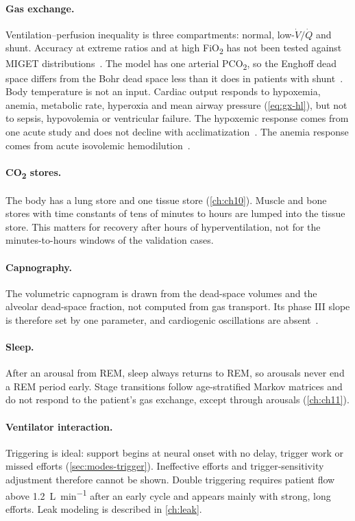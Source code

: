 \paragraph{Gas exchange.} Ventilation--perfusion inequality is three compartments: normal, low-$\dot V/\dot Q$ and shunt. Accuracy at extreme ratios and at high FiO\textsubscript{2} has not been tested against MIGET distributions~\citep{wagner1974,west1969}. The model has one arterial PCO\textsubscript{2}, so the Enghoff dead space differs from the Bohr dead space less than it does in patients with shunt~\citep{enghoff1938}. Body temperature is not an input. Cardiac output responds to hypoxemia, anemia, metabolic rate, hyperoxia and mean airway pressure (\cref{eq:gx-hl}), but not to sepsis, hypovolemia or ventricular failure. The hypoxemic response comes from one acute study and does not decline with acclimatization~\citep{phillips1988}. The anemia response comes from acute isovolemic hemodilution~\citep{weiskopf1998}.

\paragraph{CO\textsubscript{2} stores.} The body has a lung store and one tissue store (\cref{ch:ch10}). Muscle and bone stores with time constants of tens of minutes to hours are lumped into the tissue store. This matters for recovery after hours of hyperventilation, not for the minutes-to-hours windows of the validation cases.

\paragraph{Capnography.} The volumetric capnogram is drawn from the dead-space volumes and the alveolar dead-space fraction, not computed from gas transport. Its phase III slope is therefore set by one parameter, and cardiogenic oscillations are absent~\citep{fletcher1981}.

\paragraph{Sleep.} After an arousal from REM, sleep always returns to REM, so arousals never end a REM period early. Stage transitions follow age-stratified Markov matrices and do not respond to the patient's gas exchange, except through arousals (\cref{ch:ch11}).

\paragraph{Ventilator interaction.} Triggering is ideal: support begins at neural onset with no delay, trigger work or missed efforts (\cref{sec:modes-trigger}). Ineffective efforts and trigger-sensitivity adjustment therefore cannot be shown. Double triggering requires patient flow above \SI{1.2}{\liter\per\minute} after an early cycle and appears mainly with strong, long efforts. Leak modeling is described in \cref{ch:leak}.

